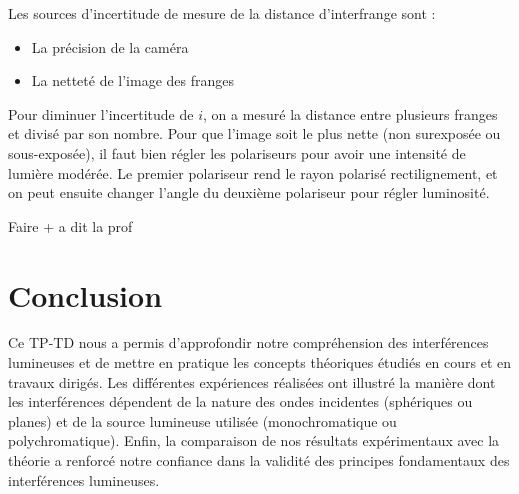 \documentclass[11pt, a4paper]{article}
\begin{document}
Les sources d'incertitude de mesure de la distance d'interfrange sont :
\begin{itemize}
    \item La précision de la caméra
    \item La netteté de l'image des franges
\end{itemize}

Pour diminuer l'incertitude de $i$, on a mesuré la distance entre plusieurs franges et divisé par son nombre. Pour que l'image soit le plus nette (non surexposée ou sous-exposée), il faut bien régler les polariseurs pour avoir une intensité de lumière modérée. Le premier polariseur rend le rayon polarisé rectilignement, et on peut ensuite changer l'angle du deuxième polariseur pour régler luminosité.

Faire + a dit la prof

\section{Conclusion}
Ce TP-TD nous a permis d'approfondir notre compréhension des interférences lumineuses et de mettre en pratique les concepts théoriques étudiés en cours et en travaux dirigés. Les différentes expériences réalisées ont illustré la manière dont les interférences dépendent de la nature des ondes incidentes (sphériques ou planes) et de la source lumineuse utilisée (monochromatique ou polychromatique). Enfin, la comparaison de nos résultats expérimentaux avec la théorie a renforcé notre confiance dans la validité des principes fondamentaux des interférences lumineuses.
\end{document}

